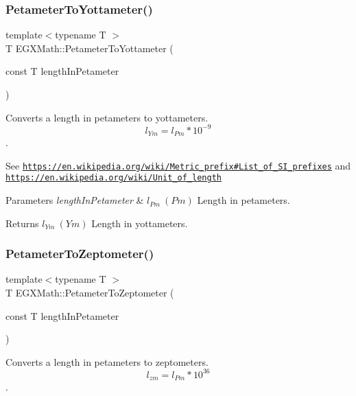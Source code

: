 \subsubsection{\texorpdfstring{Petameter\+To\+Yottameter()}{PetameterToYottameter()}}
{\footnotesize\ttfamily template$<$typename T $>$ \\
T E\+G\+X\+Math\+::\+Petameter\+To\+Yottameter (\begin{DoxyParamCaption}\item[{const T}]{length\+In\+Petameter }\end{DoxyParamCaption})}



Converts a length in petameters to yottameters. \[ l_{Ym}=l_{Pm} * 10^{-9} \]. 

See \href{https://en.wikipedia.org/wiki/Metric_prefix#List_of_SI_prefixes}{\tt https\+://en.\+wikipedia.\+org/wiki/\+Metric\+\_\+prefix\#\+List\+\_\+of\+\_\+\+S\+I\+\_\+prefixes} and \href{https://en.wikipedia.org/wiki/Unit_of_length}{\tt https\+://en.\+wikipedia.\+org/wiki/\+Unit\+\_\+of\+\_\+length} 
\begin{DoxyParams}{Parameters}
{\em length\+In\+Petameter} & $ l_{Pm}\ (Pm)$ Length in petameters. \\
\hline
\end{DoxyParams}
\begin{DoxyReturn}{Returns}
$ l_{Ym}\ (Ym)$ Length in yottameters. 
\end{DoxyReturn}
\mbox{\label{group___e_g_x_math-_conversions-_length_conversions-_s_i-_petameter-_s_i_ga8c7a1ddfa7557e65e26e65e17a9e3a45}} 
\subsubsection{\texorpdfstring{Petameter\+To\+Zeptometer()}{PetameterToZeptometer()}}
{\footnotesize\ttfamily template$<$typename T $>$ \\
T E\+G\+X\+Math\+::\+Petameter\+To\+Zeptometer (\begin{DoxyParamCaption}\item[{const T}]{length\+In\+Petameter }\end{DoxyParamCaption})}



Converts a length in petameters to zeptometers. \[ l_{zm}=l_{Pm} * 10^{36} \]. 

